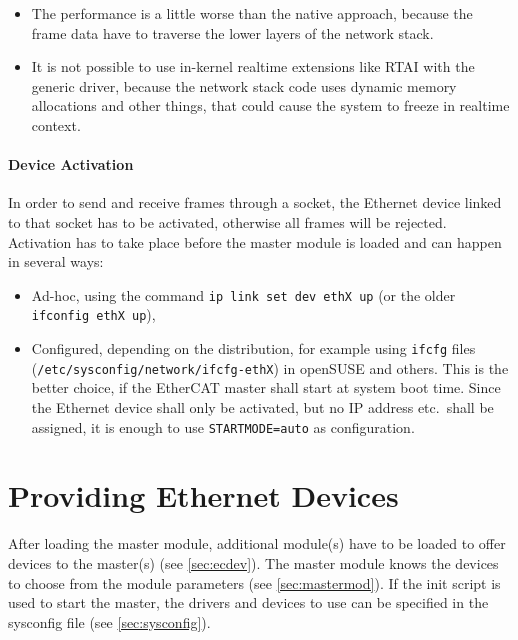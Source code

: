 \documentclass[a4paper,12pt,BCOR6mm,bibtotoc,idxtotoc]{scrbook}
\begin{document}
\begin{itemize}
\item The performance is a little worse than the native approach, because the
frame data have to traverse the lower layers of the network stack.
\item It is not possible to use in-kernel realtime extensions like RTAI with
the generic driver, because the network stack code uses dynamic memory
allocations and other things, that could cause the system to freeze in
realtime context.
\end{itemize}

\paragraph{Device Activation} In order to send and receive frames through a
socket, the Ethernet device linked to that socket has to be activated,
otherwise all frames will be rejected. Activation has to take place before the
master module is loaded and can happen in several ways:

\begin{itemize}

\item Ad-hoc, using the command \lstinline+ip link set dev ethX up+ (or the
older \lstinline+ifconfig ethX up+),

\item Configured, depending on the distribution, for example using
\lstinline+ifcfg+ files (\lstinline+/etc/sysconfig/network/ifcfg-ethX+) in
openSUSE and others. This is the better choice, if the EtherCAT master shall
start at system boot time. Since the Ethernet device shall only be activated,
but no IP address etc.\ shall be assigned, it is enough to use
\lstinline+STARTMODE=auto+ as configuration.

\end{itemize}


\section{Providing Ethernet Devices}
\label{sec:providing-devices}

After loading the master module, additional module(s) have to be loaded to
offer devices to the master(s) (see \autoref{sec:ecdev}). The master module
knows the devices to choose from the module parameters (see
\autoref{sec:mastermod}). If the init script is used to start the master, the
drivers and devices to use can be specified in the sysconfig file (see
\autoref{sec:sysconfig}).
\end{document}
